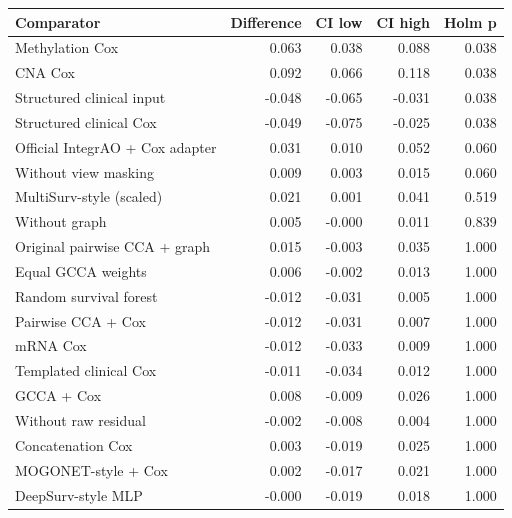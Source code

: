 \documentclass[10pt]{article}
\begin{document}
\begin{center}
\footnotesize
\begin{tabular}{lrrrr}\hline
Comparator & Difference & CI low & CI high & Holm p\\\hline
Methylation Cox & 0.063 & 0.038 & 0.088 & 0.038\\
CNA Cox & 0.092 & 0.066 & 0.118 & 0.038\\
Structured clinical input & -0.048 & -0.065 & -0.031 & 0.038\\
Structured clinical Cox & -0.049 & -0.075 & -0.025 & 0.038\\
Official IntegrAO + Cox adapter & 0.031 & 0.010 & 0.052 & 0.060\\
Without view masking & 0.009 & 0.003 & 0.015 & 0.060\\
MultiSurv-style (scaled) & 0.021 & 0.001 & 0.041 & 0.519\\
Without graph & 0.005 & -0.000 & 0.011 & 0.839\\
Original pairwise CCA + graph & 0.015 & -0.003 & 0.035 & 1.000\\
Equal GCCA weights & 0.006 & -0.002 & 0.013 & 1.000\\
Random survival forest & -0.012 & -0.031 & 0.005 & 1.000\\
Pairwise CCA + Cox & -0.012 & -0.031 & 0.007 & 1.000\\
mRNA Cox & -0.012 & -0.033 & 0.009 & 1.000\\
Templated clinical Cox & -0.011 & -0.034 & 0.012 & 1.000\\
GCCA + Cox & 0.008 & -0.009 & 0.026 & 1.000\\
Without raw residual & -0.002 & -0.008 & 0.004 & 1.000\\
Concatenation Cox & 0.003 & -0.019 & 0.025 & 1.000\\
MOGONET-style + Cox & 0.002 & -0.017 & 0.021 & 1.000\\
DeepSurv-style MLP & -0.000 & -0.019 & 0.018 & 1.000\\
\hline\end{tabular}
\end{center}
\end{document}
